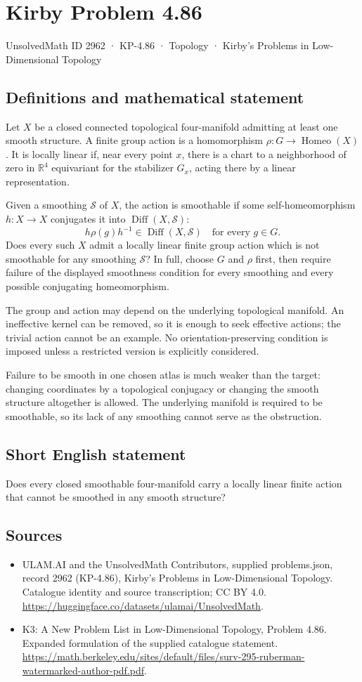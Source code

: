 \documentclass[11pt,a4paper]{article}
\begin{document}
\section*{Kirby Problem 4.86}\label{2962}
{\small UnsolvedMath ID 2962 · KP-4.86 · Topology · Kirby's Problems in Low-Dimensional Topology}
\subsection{Definitions and mathematical statement}
Let $X$ be a closed connected topological four-manifold admitting at least one smooth structure. A finite group action is a homomorphism $\rho:G\to\operatorname{Homeo}(X)$. It is locally linear if, near every point $x$, there is a chart to a neighborhood of zero in $\mathbb R^4$ equivariant for the stabilizer $G_x$, acting there by a linear representation.

Given a smoothing $\mathcal S$ of $X$, the action is smoothable if some self-homeomorphism $h:X\to X$ conjugates it into $\operatorname{Diff}(X,\mathcal S)$:
\[
h\rho(g)h^{-1}\in\operatorname{Diff}(X,\mathcal S)
\quad\text{for every }g\in G.
\]
Does every such $X$ admit a locally linear finite group action which is not smoothable for any smoothing $\mathcal S$? In full, choose $G$ and $\rho$ first, then require failure of the displayed smoothness condition for every smoothing and every possible conjugating homeomorphism.

The group and action may depend on the underlying topological manifold. An ineffective kernel can be removed, so it is enough to seek effective actions; the trivial action cannot be an example. No orientation-preserving condition is imposed unless a restricted version is explicitly considered.

Failure to be smooth in one chosen atlas is much weaker than the target: changing coordinates by a topological conjugacy or changing the smooth structure altogether is allowed. The underlying manifold is required to be smoothable, so its lack of any smoothing cannot serve as the obstruction.
\subsection{Short English statement}
Does every closed smoothable four-manifold carry a locally linear finite action that cannot be smoothed in any smooth structure?
\subsection{Sources}
\begin{itemize}
\item[S1] ULAM.AI and the UnsolvedMath Contributors, supplied problems.json, record 2962 (KP-4.86), Kirby's Problems in Low-Dimensional Topology. Catalogue identity and source transcription; CC BY 4.0.
\url{https://huggingface.co/datasets/ulamai/UnsolvedMath}.
\item[S2] K3: A New Problem List in Low-Dimensional Topology, Problem 4.86. Expanded formulation of the supplied catalogue statement.
\url{https://math.berkeley.edu/sites/default/files/surv-295-ruberman-watermarked-author-pdf.pdf}.
\end{itemize}
\end{document}

